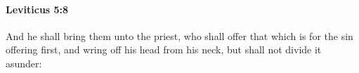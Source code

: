 
		\paragraph{Leviticus 5:8} %
			\label{LEVITICUS-5-8}

			And he shall bring them unto the priest, who shall offer that which is for the sin offering first, and wring off his head from his neck, but shall not divide it asunder:


